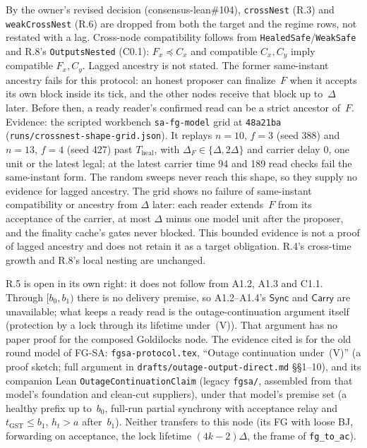 \documentclass{article}
\begin{document}
By the owner's revised decision (consensus-lean\#104), \texttt{crossNest}
(R.3) and \texttt{weakCrossNest} (R.6) are dropped from both the target and
the regime rows, not restated with a lag.  Cross-node compatibility follows
from \texttt{HealedSafe}/\texttt{WeakSafe} and R.8's \texttt{OutputsNested}
(C0.1): $F_x\preceq C_x$ and compatible $C_x,C_y$ imply compatible $F_x,C_y$.
Lagged ancestry is not stated.  The former same-instant ancestry fails for
this protocol: an honest proposer can finalize~$F$ when it accepts its
own block inside its tick, and the other nodes receive that block up
to~$\Delta$ later.  Before then, a ready reader's confirmed read can be a
strict ancestor of~$F$.  Evidence: the scripted workbench \texttt{sa-fg-model}
grid at \texttt{48a21ba} (\texttt{runs/crossnest-shape-grid.json}).  It
replays $n=10$, $f=3$ (seed 388) and $n=13$, $f=4$ (seed 427) past
$T_{\mathrm{heal}}$, with $\Delta_F\in\{\Delta,2\Delta\}$ and carrier delay
$0$, one unit or the latest legal; at the latest carrier time 94 and 189 read
checks fail the same-instant form.  The random sweeps never reach this shape,
so they supply no evidence for lagged ancestry.  The grid shows no failure
of same-instant compatibility or ancestry from $\Delta$ later: each reader
extends~$F$ from its acceptance of the carrier, at most $\Delta$ minus one
model unit after the proposer, and the finality cache's gates never blocked.
This bounded evidence is not a proof of lagged ancestry and does not retain
it as a target obligation.  R.4's cross-time growth and R.8's local nesting
are unchanged.

R.5 is open in its own right: it does not follow from A1.2, A1.3 and C1.1.
Through $[b_0,b_1)$ there is no delivery premise, so A1.2--A1.4's
$\mathsf{Sync}$ and $\mathsf{Carry}$ are unavailable; what keeps a ready read
is the outage-continuation argument itself (protection by a lock through its
lifetime under~(V)).  That argument has no paper proof for the composed
Goldilocks node.  The evidence cited is for the old round model of FG-SA:
\texttt{fgsa-protocol.tex}, ``Outage continuation under~(V)'' (a proof sketch;
full argument in \texttt{drafts/outage-output-direct.md} \S\S1--10), and its
companion Lean \texttt{OutageContinuationClaim} (legacy \texttt{fgsa/}, assembled
from that model's foundation and clean-cut suppliers), under that model's
premise set (a healthy prefix up to~$b_0$, full-run partial synchrony with
acceptance relay and $t_{\mathrm{GST}}\leq b_1$, $h_t>a$ after~$b_1$).  Neither
transfers to this node (its FG with loose BJ, forwarding on acceptance, the
lock lifetime $(4k-2)\Delta$, the frame of \texttt{fg\_to\_ac}).
\end{document}
